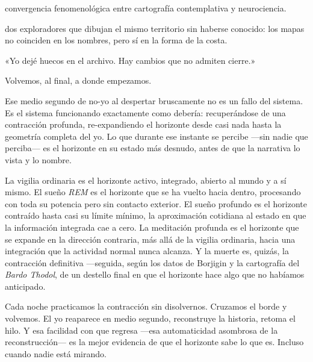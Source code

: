 \begin{fisica}
 convergencia fenomenológica entre cartografía contemplativa y neurociencia.

 dos exploradores que dibujan el mismo territorio sin haberse conocido: los mapas no coinciden en los nombres, pero sí en la forma de la costa.
\end{fisica}
\begin{cita}
«Yo dejé huecos en el archivo. Hay cambios que no admiten cierre.»
\end{cita}
\noindent Volvemos, al final, a donde empezamos.

Ese medio segundo de no-yo al despertar bruscamente no es un fallo del sistema. Es el sistema funcionando exactamente como debería: recuperándose de una contracción profunda, re-expandiendo el horizonte desde casi nada hasta la geometría completa del yo. Lo que durante ese instante se percibe —sin nadie que perciba— es el horizonte en su estado más desnudo, antes de que la narrativa lo vista y lo nombre.

La vigilia ordinaria es el horizonte activo, integrado, abierto al mundo y a sí mismo. El sueño \emph{REM} es el horizonte que se ha vuelto hacia dentro, procesando con toda su potencia pero sin contacto exterior. El sueño profundo es el horizonte contraído hasta casi su límite mínimo, la aproximación cotidiana al estado en que la información integrada cae a cero. La meditación profunda es el horizonte que se expande en la dirección contraria, más allá de la vigilia ordinaria, hacia una integración que la actividad normal nunca alcanza. Y la muerte es, quizás, la contracción definitiva —seguida, según los datos de Borjigin y la cartografía del \emph{Bardo Thodol}, de un destello final en que el horizonte hace algo que no habíamos anticipado.

Cada noche practicamos la contracción sin disolvernos. Cruzamos el borde y volvemos. El yo reaparece en medio segundo, reconstruye la historia, retoma el hilo. Y esa facilidad con que regresa —esa automaticidad asombrosa de la reconstrucción— es la mejor evidencia de que el horizonte sabe lo que es. Incluso cuando nadie está mirando.

